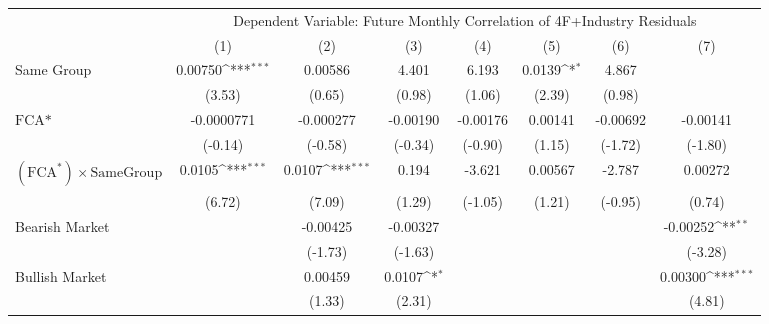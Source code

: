 {
\def\sym#1{\ifmmode^{#1}\else\(^{#1}\)\fi}
\begin{tabular}{l*{7}{c}}
\hline\hline
                &\multicolumn{7}{c}{Dependent Variable: Future Monthly Correlation of 4F+Industry Residuals}                                         \\\cmidrule(lr){2-8}
                &\multicolumn{1}{c}{(1)}         &\multicolumn{1}{c}{(2)}         &\multicolumn{1}{c}{(3)}         &\multicolumn{1}{c}{(4)}         &\multicolumn{1}{c}{(5)}         &\multicolumn{1}{c}{(6)}         &\multicolumn{1}{c}{(7)}         \\
\hline
Same Group      &  0.00750\sym{***}&  0.00586         &    4.401         &    6.193         &   0.0139\sym{*}  &    4.867         &                  \\
                &   (3.53)         &   (0.65)         &   (0.98)         &   (1.06)         &   (2.39)         &   (0.98)         &                  \\
[1em]
$ \text{FCA*} $ &-0.0000771         &-0.000277         & -0.00190         & -0.00176         &  0.00141         & -0.00692         & -0.00141         \\
                &  (-0.14)         &  (-0.58)         &  (-0.34)         &  (-0.90)         &   (1.15)         &  (-1.72)         &  (-1.80)         \\
[1em]
 $ (\text{FCA}^*) \times {\text{SameGroup} }  $ &   0.0105\sym{***}&   0.0107\sym{***}&    0.194         &   -3.621         &  0.00567         &   -2.787         &  0.00272         \\
                &   (6.72)         &   (7.09)         &   (1.29)         &  (-1.05)         &   (1.21)         &  (-0.95)         &   (0.74)         \\
[1em]
Bearish Market  &                  & -0.00425         & -0.00327         &                  &                  &                  & -0.00252\sym{**} \\
                &                  &  (-1.73)         &  (-1.63)         &                  &                  &                  &  (-3.28)         \\
[1em]
Bullish Market  &                  &  0.00459         &   0.0107\sym{*}  &                  &                  &                  &  0.00300\sym{***}\\
                &                  &   (1.33)         &   (2.31)         &                  &                  &                  &   (4.81)         \\

\end{tabular}}
